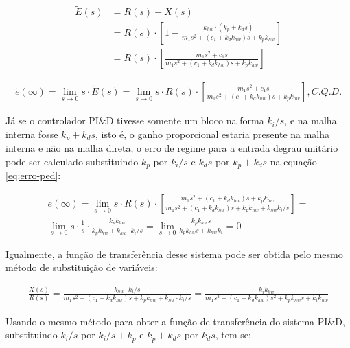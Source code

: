 \documentclass[a4paper,11pt]{article}
\begin{document}
\begin{align*}
    \widetilde{E}\left(s\right) &= R\left(s\right) - X\left(s\right) \\
    &= R\left(s\right) \cdot \left[1 - \frac{k_{hw} \cdot \left(k_p +
        k_d s\right)}{m_1 s^2 + \left(c_1 + k_d k_{hw}\right) s + k_p k_{hw}}
        \right] \\
    &= R\left(s\right) \cdot \left[\frac{m_1 s^2 + c_1 s}{m_1 s^2 + \left(c_1 +
        k_d k_{hw}\right) s + k_p k_{hw}}\right]
\end{align*}

\begin{gather*}
    \widetilde{e}\left(\infty\right) = \lim_{s \to 0} s \cdot
        \widetilde{E}\left(s\right) = \lim_{s \to 0} s \cdot R\left(s\right)
        \cdot \left[\frac{m_1 s^2 + c_1 s}{m_1 s^2 +
        \left(c_1 + k_d k_{hw}\right) s + k_p k_{hw}}\right], C.Q.D.
\end{gather*}

Já se o controlador PI\&D tivesse somente um bloco na forma $k_i/s$, e na malha
interna fosse $k_p + k_d s$, isto é, o ganho proporcional estaria presente na
malha interna e não na malha direta, o erro de regime para a entrada degrau
unitário pode ser calculado substituindo $k_p$ por $k_i/s$ e $k_d s$ por
$k_p + k_d s$ na equação \ref{eq:erro-ped}:

\begin{gather*}
    e\left(\infty\right) = \lim_{s \to 0} s \cdot R\left(s\right) \cdot
        \left[\frac{m_1 s^2 + \left(c_1 + k_d k_{hw}\right) s + k_p k_{hw}}
        {m_1 s^2 + \left(c_1 + k_d k_{hw}\right) s + k_p k_{hw} +
        k_{hw} k_i/s}\right] = \\
    \lim_{s \to 0} s \cdot \frac{1}{s} \cdot \frac{k_p k_{hw}}{k_p k_{hw} +
        k_{hw} \cdot k_i/s} = \lim_{s \to 0} \frac{k_p k_{hw} s}{k_p k_{hw} s +
        k_{hw} k_i} = 0
\end{gather*}

Igualmente, a função de transferência desse sistema pode ser obtida pelo mesmo
método de substituição de variáveis:

\begin{gather*}
    \frac{X\left(s\right)}{R\left(s\right)} = \frac{k_{hw} \cdot k_i/s}
        {m_1 s^2 + \left(c_1 + k_d k_{hw}\right) s + k_p k_{hw} +
        k_{hw} \cdot k_i/s} = \frac{k_i k_{hw}}{m_1 s^3 + \left(c_1 +
        k_d k_{hw}\right) s^2 + k_p k_{hw} s + k_i k_{hw}}
\end{gather*}

Usando o mesmo método para obter a função de transferência do sistema PI\&D,
substituindo $k_i/s$ por $k_i/s + k_p$ e $k_p + k_d s$ por $k_d s$, tem-se:
\end{document}
